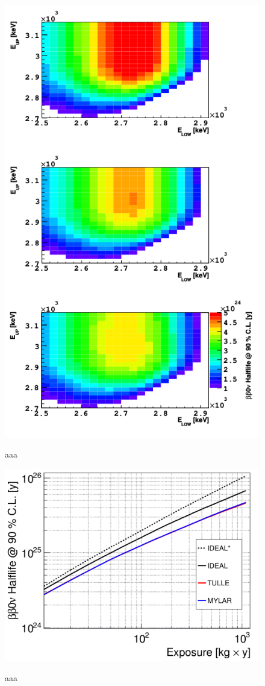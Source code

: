 \documentclass[main.tex]{subfiles}
\begin{document}
\begin{figure}[h!]
\centering
\includegraphics[scale=0.3]{pictures/Chap4/Sens2D-3designs.png}
\label{Sens2D-3designs.png}
\caption{aaa}
\end{figure}


\begin{figure}[h!]
\centering
\includegraphics[scale=0.3]{pictures/Chap4/SensVsExposure3Designs.png}
\label{SensVsExposure3Designs.png}
\caption{aaa}
\end{figure}
\end{document}
